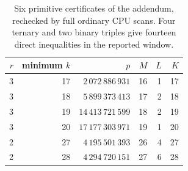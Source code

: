 \begin{table}[htbp]\centering\small
\begin{tabular}{rrrrrr}\toprule $r$ & minimum $k$ & $p$ & $M$ & $L$ & $K$\\\midrule
3 & 17 & $2\,072\,886\,931$ & 16 & 1 & 17\\
3 & 18 & $5\,899\,373\,413$ & 17 & 2 & 18\\
3 & 19 & $14\,413\,721\,599$ & 18 & 2 & 19\\
3 & 20 & $17\,177\,303\,971$ & 19 & 1 & 20\\
2 & 27 & $4\,195\,501\,393$ & 26 & 4 & 27\\
2 & 28 & $4\,294\,720\,151$ & 27 & 6 & 28\\
\bottomrule\end{tabular}
\caption{Six primitive certificates of the addendum, rechecked by full ordinary CPU scans. Four ternary and two binary triples give fourteen direct inequalities in the reported window.}\label{tab:updated-primitive}
\end{table}
